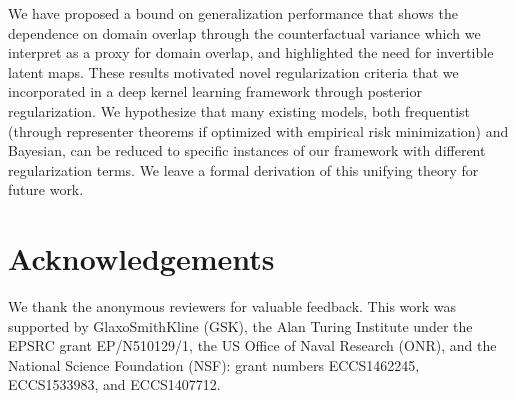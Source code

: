 \documentclass[twoside]{article}
\begin{document}
We have proposed a bound on generalization performance that shows the dependence on domain overlap through the counterfactual variance which we interpret as a proxy for domain overlap, and highlighted the need for invertible latent maps. These results motivated novel regularization criteria that we incorporated in a deep kernel learning framework through posterior regularization. We hypothesize that many existing models, both frequentist (through representer theorems if optimized with empirical risk minimization) and Bayesian, can be reduced to specific instances of our framework with different regularization terms. We leave a formal derivation of this unifying theory for future work.


\section*{Acknowledgements}
We thank the anonymous reviewers for valuable feedback. This work was supported by GlaxoSmithKline (GSK), the Alan Turing Institute under the EPSRC grant EP/N510129/1, the US Office of Naval Research (ONR), and the National Science Foundation (NSF): grant numbers ECCS1462245, ECCS1533983, and ECCS1407712.
\balance


\end{document}
